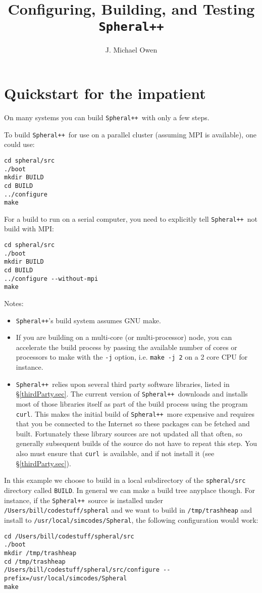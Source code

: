 \documentclass{article}
\newcommand{\Spheral}{{\tt Spheral++}}
\newcommand{\curl}{{\tt curl}}
\begin{document}
\title{Configuring, Building, and Testing \Spheral}
\author{J. Michael Owen}
\maketitle

\section{Quickstart for the impatient}
\label{quick.sec}
On many systems you can build \Spheral\ with only a few steps.

To build \Spheral\ for use on a parallel cluster (assuming MPI is available),
one could use:
\begin{verbatim}
cd spheral/src
./boot
mkdir BUILD
cd BUILD
../configure
make
\end{verbatim}

For a build to run on a serial computer, you need to explicitly tell
\Spheral\ not build with MPI:
\begin{verbatim}
cd spheral/src
./boot
mkdir BUILD
cd BUILD
../configure --without-mpi
make
\end{verbatim}
Notes:
\begin{itemize}
\item \Spheral's build system assumes GNU make.
\item If you are building on a multi-core (or multi-processor) node, you can accelerate the build process by passing the available number of cores or processors to make with the \verb+-j+ option, i.e. \verb+make -j 2+ on a 2 core CPU for instance.
\item \Spheral\ relies upon several third party software libraries, listed in \S \ref{thirdParty.sec}.  The current version of \Spheral\ downloads and installs most of those libraries itself as part of the build process using the program \curl.  This makes the initial build of \Spheral\ more expensive and requires that you be connected to the Internet so these packages can be fetched and built.  Fortunately these library sources are not updated all that often, so generally subsequent builds of the source do not have to repeat this step.  You also must ensure that \curl\ is available, and if not install it (see \S\ref{thirdParty.sec}).
\end{itemize}

In this example we choose to build in a local subdirectory of the {\tt spheral/src} directory called {\tt BUILD}.  In general we can make a build tree anyplace though.  For instance, if the \Spheral\ source is installed under {\tt /Users/bill/codestuff/spheral} and we want to build in {\tt /tmp/trashheap} and install to {\tt /usr/local/simcodes/Spheral}, the following configuration would work:
\begin{verbatim}
cd /Users/bill/codestuff/spheral/src
./boot
mkdir /tmp/trashheap
cd /tmp/trashheap
/Users/bill/codestuff/spheral/src/configure --prefix=/usr/local/simcodes/Spheral
make
\end{verbatim}
\end{document}

